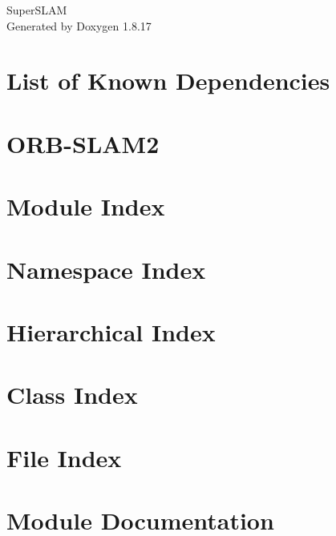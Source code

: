 \let\mypdfximage\pdfximage\def\pdfximage{\immediate\mypdfximage}\documentclass[twoside]{book}
\newcommand{\+}{\discretionary{\mbox{\scriptsize$\hookleftarrow$}}{}{}}
\newcommand{\clearemptydoublepage}{%
  \newpage{\pagestyle{empty}\cleardoublepage}%
}
\begin{document}
\hypersetup{pageanchor=false,
             bookmarksnumbered=true,
             pdfencoding=unicode
            }
\begin{titlepage}
\vspace*{7cm}
\begin{center}%
{\Large Super\+S\+L\+AM }\\
\vspace*{1cm}
{\large Generated by Doxygen 1.8.17}\\
\end{center}
\end{titlepage}
\clearemptydoublepage
{}
\tableofcontents
\clearemptydoublepage
{}
\hypersetup{pageanchor=true}

\chapter{List of Known Dependencies}
\label{md__dependencies}

\chapter{O\+R\+B-\/\+S\+L\+A\+M2}
\label{md__r_e_a_d_m_e}

\chapter{Module Index}

\chapter{Namespace Index}

\chapter{Hierarchical Index}

\chapter{Class Index}

\chapter{File Index}

\chapter{Module Documentation}



\end{document}
